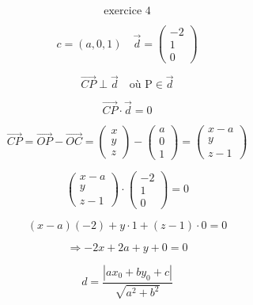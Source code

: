\documentclass{article}
\begin{document}
\[
\text{exercice 4}
\]

\[
c=(a,0,1) \quad \vec{d} = \begin{pmatrix} -2 \\ 1 \\ 0 \end{pmatrix}
\]

\[
\vec{CP} \perp \vec{d} \quad \text{où P} \in \vec{d}
\]

\[
\vec{CP} \cdot \vec{d} = 0
\]

\[
\vec{CP} = \vec{OP} - \vec{OC} = \begin{pmatrix} x \\ y \\ z \end{pmatrix} - \begin{pmatrix} a \\ 0 \\ 1 \end{pmatrix} = \begin{pmatrix} x-a \\ y \\ z-1 \end{pmatrix}
\]

\[
\begin{pmatrix} x-a \\ y \\ z-1 \end{pmatrix} \cdot \begin{pmatrix} -2 \\ 1 \\ 0 \end{pmatrix} = 0
\]

\[
(x-a)(-2) + y \cdot 1 + (z-1) \cdot 0 = 0
\]

\[
\Rightarrow -2x + 2a + y + 0 = 0
\]

\[
d = \frac{|ax_0 + by_0 + c|}{\sqrt{a^2+b^2}}
\]
\end{document}
